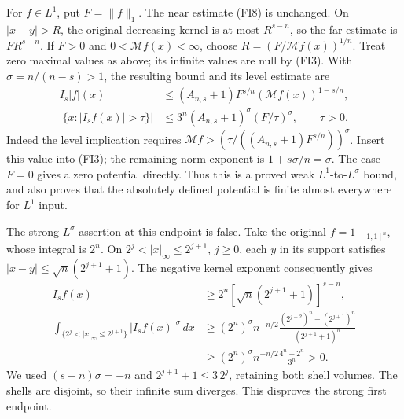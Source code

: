 \documentclass[
  11pt,
]{article}
\begin{document}
For \(f\in L^1\), put \(F=\|f\|_1\). The near estimate (FI8) is
unchanged. On \(|x-y|>R\), the original decreasing kernel is at most
\(R^{s-n}\), so the far estimate is \(FR^{s-n}\). If \(F>0\) and
\(0<\mathcal Mf(x)<\infty\), choose \(R=(F/\mathcal Mf(x))^{1/n}\).
Treat zero maximal values as above; its infinite values are null by
(FI3). With \(\sigma=n/(n-s)>1\), the resulting bound and its level
estimate are \[
 \begin{split}
 I_s|f|(x)&\leq(A_{n,s}+1)F^{s/n}
                          (\mathcal Mf(x))^{1-s/n},\\
 |\{x:|I_sf(x)|>\tau\}|
 &\leq3^n(A_{n,s}+1)^\sigma(F/\tau)^\sigma,
                       \qquad \tau>0 .
 \end{split}                                                   \tag{FI12}
\] Indeed the level implication requires
\(\mathcal Mf>(\tau/((A_{n,s}+1)F^{s/n}))^\sigma\). Insert this value
into (FI3); the remaining norm exponent is \(1+s\sigma/n=\sigma\). The
case \(F=0\) gives a zero potential directly. Thus this is a proved weak
\(L^1\)-to-\(L^\sigma\) bound, and also proves that the absolutely
defined potential is finite almost everywhere for \(L^1\) input.

The strong \(L^\sigma\) assertion at this endpoint is false. Take the
original \(f=1_{[-1,1]^n}\), whose integral is \(2^n\). On
\(2^j<|x|_\infty\leq2^{j+1}\), \(j\geq0\), each \(y\) in its support
satisfies \(|x-y|\leq\sqrt n(2^{j+1}+1)\). The negative kernel exponent
consequently gives \[
 \begin{split}
 I_sf(x)&\geq 2^n
                  [\sqrt n(2^{j+1}+1)]^{s-n},\\
 \int_{\{2^j<|x|_\infty\leq2^{j+1}\}}|I_sf(x)|^\sigma\,dx
 &\geq(2^n)^\sigma n^{-n/2}
             \frac{(2^{j+2})^n-(2^{j+1})^n}{(2^{j+1}+1)^n}\\
 &\geq(2^n)^\sigma n^{-n/2}\frac{4^n-2^n}{3^n}>0.
 \end{split}                                                   \tag{FI13}
\] We used \((s-n)\sigma=-n\) and \(2^{j+1}+1\leq3\,2^j\), retaining
both shell volumes. The shells are disjoint, so their infinite sum
diverges. This disproves the strong first endpoint.
\end{document}

